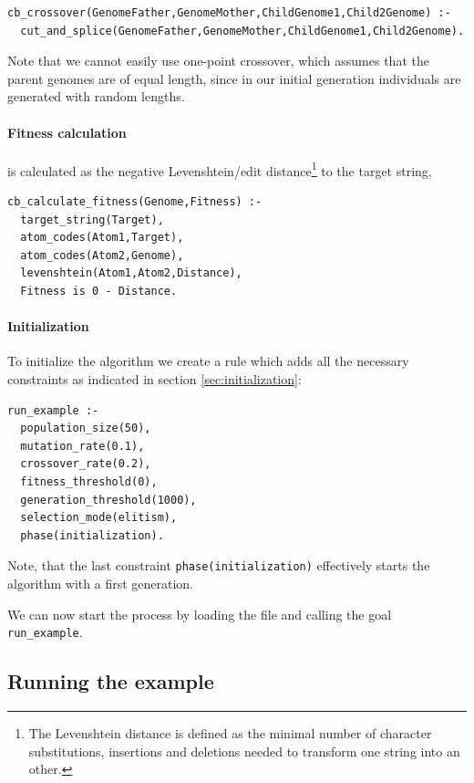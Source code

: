 \documentclass{article}
\begin{document}
\begin{verbatim}
cb_crossover(GenomeFather,GenomeMother,ChildGenome1,Child2Genome) :-
  cut_and_splice(GenomeFather,GenomeMother,ChildGenome1,Child2Genome).
\end{verbatim}

Note that we cannot easily use one-point crossover, which assumes that the parent genomes are of equal length, since in our initial generation individuals are generated
with random lengths.

\paragraph{Fitness calculation} is calculated as the negative Levenshtein/edit distance\footnote{The Levenshtein distance is defined as the minimal number of character substitutions, insertions and deletions needed to transform one string into an other.} to the target string,

\begin{verbatim}
cb_calculate_fitness(Genome,Fitness) :-
  target_string(Target),
  atom_codes(Atom1,Target),
  atom_codes(Atom2,Genome),
  levenshtein(Atom1,Atom2,Distance),
  Fitness is 0 - Distance.
\end{verbatim}

\paragraph{Initialization}

To initialize the algorithm we create a rule which adds all the necessary constraints as indicated in section \ref{sec:initialization}:

\begin{verbatim}
run_example :-
  population_size(50), 
  mutation_rate(0.1),
  crossover_rate(0.2),
  fitness_threshold(0),
  generation_threshold(1000),
  selection_mode(elitism), 
  phase(initialization). 
\end{verbatim}

Note, that the last constraint \verb|phase(initialization)| effectively starts the algorithm with a first generation.

We can now start the process by loading the file and calling the goal \verb|run_example|. 

\subsection{Running the example}
\end{document}

